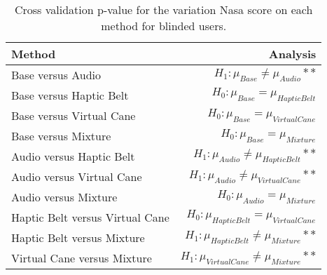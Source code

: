 
\begin{table}[!htb]
\centering
\caption{Cross validation p-value for the variation Nasa score on each method for blinded users.}
\label{tab:lsd_nasa_var}
\begin{tabular}{lr}
\toprule
                         Method &                                       Analysis \\
\midrule
              Base versus Audio &           $H_1 : \mu_{Base} \ne \mu_{Audio}**$ \\
        Base versus Haptic Belt &         $H_0 : \mu_{Base} = \mu_{Haptic Belt}$ \\
       Base versus Virtual Cane &        $H_0 : \mu_{Base} = \mu_{Virtual Cane}$ \\
            Base versus Mixture &             $H_0 : \mu_{Base} = \mu_{Mixture}$ \\
       Audio versus Haptic Belt &    $H_1 : \mu_{Audio} \ne \mu_{Haptic Belt}**$ \\
      Audio versus Virtual Cane &   $H_1 : \mu_{Audio} \ne \mu_{Virtual Cane}**$ \\
           Audio versus Mixture &            $H_0 : \mu_{Audio} = \mu_{Mixture}$ \\
Haptic Belt versus Virtual Cane & $H_0 : \mu_{Haptic Belt} = \mu_{Virtual Cane}$ \\
     Haptic Belt versus Mixture &  $H_1 : \mu_{Haptic Belt} \ne \mu_{Mixture}**$ \\
    Virtual Cane versus Mixture & $H_1 : \mu_{Virtual Cane} \ne \mu_{Mixture}**$ \\
\bottomrule
\end{tabular}
\end{table}

